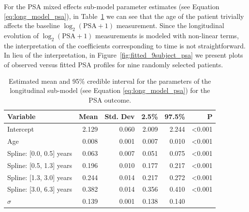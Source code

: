 For the PSA mixed effects sub-model parameter estimates (see Equation \ref{eq:long_model_psa}), in Table~\ref{tab:PSA_long} we can see that the age of the patient trivially affects the baseline ${\log_2(\mbox{PSA} + 1)}$ measurement. Since the longitudinal evolution of ${\log_2 (\mbox{PSA} + 1)}$ measurements is modeled with non-linear terms, the interpretation of the coefficients corresponding to time is not straightforward. In lieu of the interpretation, in Figure~\ref{fig:fitted_9subject_psa} we present plots of observed versus fitted PSA profiles for nine randomly selected patients. 
\begin{table}[!htb]
\small\sf\centering
\caption{Estimated mean and 95\% credible interval for the parameters of the longitudinal sub-model (see Equation \ref{eq:long_model_psa}) for the PSA outcome.}
\label{tab:PSA_long}
\begin{tabular}{lrrrrr}
\hline
Variable                         & Mean & Std. Dev & 2.5\%  & 97.5\% & P     \\
\hline
Intercept & 2.129    & 0.060  & 2.009 & 2.244 & \textless0.001 \\
Age & 0.008    & 0.001 & 0.007 & 0.010   &\textless0.001 \\
Spline: [0.0, 0.5] years & 0.063    & 0.007 & 0.051 & 0.075  & \textless0.001 \\
Spline: [0.5, 1.3] years & 0.196    & 0.010  & 0.177 & 0.217  & \textless0.001 \\
Spline: [1.3, 3.0] years & 0.244    & 0.014 & 0.217 & 0.272  & \textless0.001 \\
Spline: [3.0, 6.3] years & 0.382    & 0.014 & 0.356 & 0.410 &  \textless0.001 \\
$\sigma$ & 0.139    & 0.001 & 0.138 & 0.140  & \\
\hline
\end{tabular}
\end{table}

